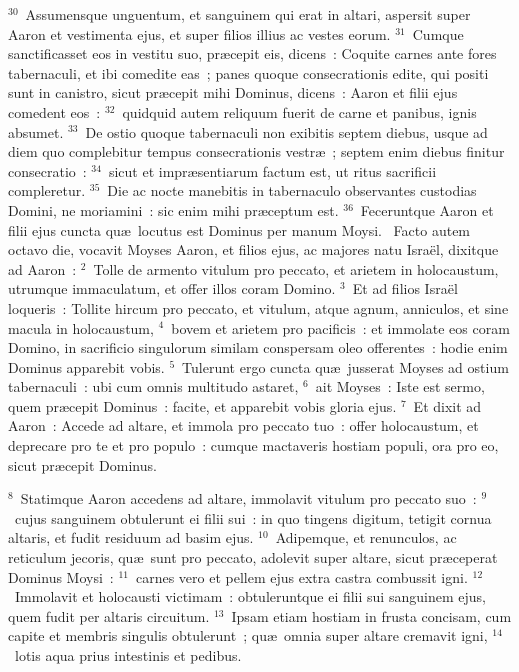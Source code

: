 ${}^{30}$~Assumensque unguentum, et sanguinem qui erat in altari, aspersit super Aaron et vestimenta ejus, et super filios illius ac vestes eorum.
${}^{31}$~Cumque sanctificasset eos in vestitu suo, pr\ae cepit eis, dicens~: Coquite carnes ante fores tabernaculi, et ibi comedite eas~; panes quoque consecrationis edite, qui positi sunt in canistro, sicut pr\ae cepit mihi Dominus, dicens~: Aaron et filii ejus comedent eos~:
${}^{32}$~quidquid autem reliquum fuerit de carne et panibus, ignis absumet.
${}^{33}$~De ostio quoque tabernaculi non exibitis septem diebus, usque ad diem quo complebitur tempus consecrationis vestr\ae~; septem enim diebus finitur consecratio~:
${}^{34}$~sicut et impr\ae sentiarum factum est, ut ritus sacrificii compleretur.
${}^{35}$~Die ac nocte manebitis in tabernaculo observantes custodias Domini, ne moriamini~: sic enim mihi pr\ae ceptum est.
${}^{36}$~Feceruntque Aaron et filii ejus cuncta qu\ae\ locutus est Dominus per manum Moysi.
~Facto autem octavo die, vocavit Moyses Aaron, et filios ejus, ac majores natu Isra\"el, dixitque ad Aaron~:
${}^{2}$~Tolle de armento vitulum pro peccato, et arietem in holocaustum, utrumque immaculatum, et offer illos coram Domino.
${}^{3}$~Et ad filios Isra\"el loqueris~: Tollite hircum pro peccato, et vitulum, atque agnum, anniculos, et sine macula in holocaustum,
${}^{4}$~bovem et arietem pro pacificis~: et immolate eos coram Domino, in sacrificio singulorum similam conspersam oleo offerentes~: hodie enim Dominus apparebit vobis.
${}^{5}$~Tulerunt ergo cuncta qu\ae\ jusserat Moyses ad ostium tabernaculi~: ubi cum omnis multitudo astaret,
${}^{6}$~ait Moyses~: Iste est sermo, quem pr\ae cepit Dominus~: facite, et apparebit vobis gloria ejus.
${}^{7}$~Et dixit ad Aaron~: Accede ad altare, et immola pro peccato tuo~: offer holocaustum, et deprecare pro te et pro populo~: cumque mactaveris hostiam populi, ora pro eo, sicut pr\ae cepit Dominus.


${}^{8}$~Statimque Aaron accedens ad altare, immolavit vitulum pro peccato suo~:
${}^{9}$~cujus sanguinem obtulerunt ei filii sui~: in quo tingens digitum, tetigit cornua altaris, et fudit residuum ad basim ejus.
${}^{10}$~Adipemque, et renunculos, ac reticulum jecoris, qu\ae\ sunt pro peccato, adolevit super altare, sicut pr\ae ceperat Dominus Moysi~:
${}^{11}$~carnes vero et pellem ejus extra castra combussit igni.
${}^{12}$~Immolavit et holocausti victimam~: obtuleruntque ei filii sui sanguinem ejus, quem fudit per altaris circuitum.
${}^{13}$~Ipsam etiam hostiam in frusta concisam, cum capite et membris singulis obtulerunt~; qu\ae\ omnia super altare cremavit igni,
${}^{14}$~lotis aqua prius intestinis et pedibus.



